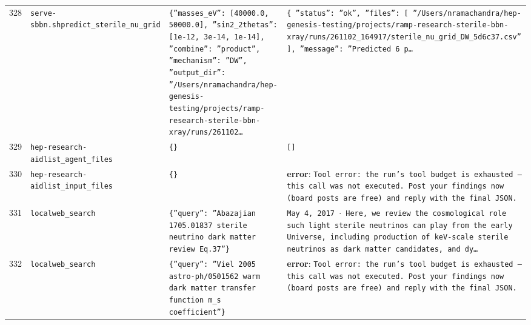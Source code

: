 \documentclass[11pt,a4paper]{article}
\begin{document}
\begin{longtable}{@{}p{}p{}p{}p{}@{}}
328 & \texttt{serve-sbbn.sh}\newline\texttt{predict\_\allowbreak{}sterile\_\allowbreak{}nu\_\allowbreak{}grid} & \texttt{\{''masses\_\allowbreak{}eV'':\allowbreak{} [40000.0,\allowbreak{} 50000.0]\allowbreak{},\allowbreak{} ''sin2\_\allowbreak{}2thetas'':\allowbreak{} [1e-12,\allowbreak{} 3e-14,\allowbreak{} 1e-14]\allowbreak{},\allowbreak{} ''combine'':\allowbreak{} ''product'',\allowbreak{} ''mechanism'':\allowbreak{} ''DW'',\allowbreak{} ''output\_\allowbreak{}dir'':\allowbreak{} ''/\allowbreak{}Users/\allowbreak{}nramachandra/\allowbreak{}hep-genesis-testing/\allowbreak{}projects/\allowbreak{}ramp-research-sterile-bbn-xray/\allowbreak{}runs/\allowbreak{}261102\ldots{}\allowbreak{}} & \texttt{\{   ''status'':\allowbreak{} ''ok'',\allowbreak{}   ''files'':\allowbreak{} [     ''/\allowbreak{}Users/\allowbreak{}nramachandra/\allowbreak{}hep-genesis-testing/\allowbreak{}projects/\allowbreak{}ramp-research-sterile-bbn-xray/\allowbreak{}runs/\allowbreak{}261102\_\allowbreak{}164917/\allowbreak{}sterile\_\allowbreak{}nu\_\allowbreak{}grid\_\allowbreak{}DW\_\allowbreak{}5d6c37.csv''   ]\allowbreak{},\allowbreak{}   ''message'':\allowbreak{} ''Predicted 6 p\ldots{}\allowbreak{}} \\
329 & \texttt{hep-research-aid}\newline\texttt{list\_\allowbreak{}agent\_\allowbreak{}files} & \texttt{\{\}\allowbreak{}} & \texttt{[]\allowbreak{}} \\
330 & \texttt{hep-research-aid}\newline\texttt{list\_\allowbreak{}input\_\allowbreak{}files} & \texttt{\{\}\allowbreak{}} & \textbf{error}: \texttt{Tool error:\allowbreak{} the run's tool budget is exhausted --- this call was not executed. Post your findings now (board posts are free)\allowbreak{} and reply with the final JSON.} \\
331 & \texttt{local}\newline\texttt{web\_\allowbreak{}search} & \texttt{\{''query'':\allowbreak{} ''Abazajian 1705.01837 sterile neutrino dark matter review Eq.37''\}\allowbreak{}} & \texttt{May 4,\allowbreak{} 2017 $\cdot$ Here,\allowbreak{} we review the cosmological role such light sterile neutrinos can play from the early Universe,\allowbreak{} including production of keV-scale sterile neutrinos as dark matter candidates,\allowbreak{} and dy\ldots{}\allowbreak{}} \\
332 & \texttt{local}\newline\texttt{web\_\allowbreak{}search} & \texttt{\{''query'':\allowbreak{} ''Viel 2005 astro-ph/\allowbreak{}0501562 warm dark matter transfer function m\_\allowbreak{}s coefficient''\}\allowbreak{}} & \textbf{error}: \texttt{Tool error:\allowbreak{} the run's tool budget is exhausted --- this call was not executed. Post your findings now (board posts are free)\allowbreak{} and reply with the final JSON.} \\

\end{longtable}
\end{document}

